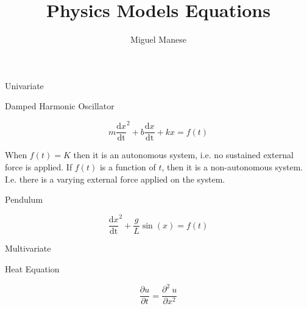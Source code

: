 \documentclass{article}
\title{Physics Models Equations}
\author{Miguel Manese}
\newcommand{\Dt}[1]{\frac{\mathrm{d}#1}{\mathrm{dt}}}
\newcommand{\PD}[2]{\frac{\partial #1}{\partial #2}}
\newcommand{\PDn}[3]{\frac{\partial^{#3}\ #1}{\partial #2^{#3}}}
\begin{document}
\maketitle

\begin{section}{Univariate}

\begin{subsection}{Damped Harmonic Oscillator}

\[ m \Dt{x}^{2} + b \Dt{x} + k x = f(t) \]

When $f(t) = K$ then it is an autonomous system, i.e. no sustained external
force is applied. If $f(t)$ is a function of $t$, then it is a 
non-autonomous system. I.e. there is a varying external force applied
on the system.
\end{subsection}

\begin{subsection}{Pendulum}

\[ \Dt{x}^2 + \frac{g}{L} \sin(x) = f(t) \]

\end{subsection}
\end{section}

\begin{section}{Multivariate}

\begin{subsection}{Heat Equation}

\[ \PD{u}{t} = \PDn{u}{x}{2} \]
\end{subsection}

\end{section}
\end{document}
